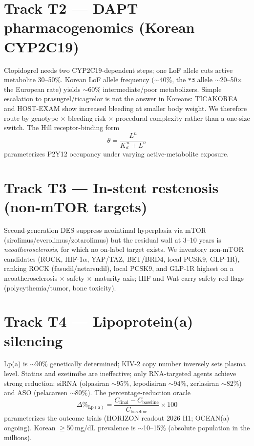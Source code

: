 \documentclass[11pt]{article}
\begin{document}
\section{Track T2 --- DAPT pharmacogenomics (Korean CYP2C19)}
\label{sec:daptpgx}

Clopidogrel needs two CYP2C19-dependent steps; one LoF allele cuts active metabolite 30--50\%. Korean LoF allele frequency ($\sim$40\%, the \texttt{*3} allele $\sim$20--50$\times$ the European rate) yields $\sim$60\% intermediate/poor metabolizers. Simple escalation to prasugrel/ticagrelor is not the answer in Koreans: TICAKOREA and HOST-EXAM show increased bleeding at smaller body weight. We therefore route by genotype $\times$ bleeding risk $\times$ procedural complexity rather than a one-size switch. The Hill receptor-binding form
\begin{equation}
\theta = \frac{L^{n}}{K_d^{\,n} + L^{n}}
\label{eq:hill}
\end{equation}
parameterizes P2Y12 occupancy under varying active-metabolite exposure.

\section{Track T3 --- In-stent restenosis (non-mTOR targets)}
\label{sec:isr}

Second-generation DES suppress neointimal hyperplasia via mTOR (sirolimus/everolimus/zotarolimus) but the residual wall at 3--10 years is \emph{neoatherosclerosis}, for which no on-label target exists. We inventory non-mTOR candidates (ROCK, HIF-1$\alpha$, YAP/TAZ, BET/BRD4, local PCSK9, GLP-1R), ranking ROCK (fasudil/netarsudil), local PCSK9, and GLP-1R highest on a neoatherosclerosis $\times$ safety $\times$ maturity axis; HIF and Wnt carry safety red flags (polycythemia/tumor, bone toxicity).

\section{Track T4 --- Lipoprotein(a) silencing}
\label{sec:lpa}

Lp(a) is $\sim$90\% genetically determined; KIV-2 copy number inversely sets plasma level. Statins and ezetimibe are ineffective; only RNA-targeted agents achieve strong reduction: siRNA (olpasiran $\sim$95\%, lepodisiran $\sim$94\%, zerlasiran $\sim$82\%) and ASO (pelacarsen $\sim$80\%). The percentage-reduction oracle
\begin{equation}
\Delta\%_{\mathrm{Lp(a)}} = \frac{C_{\mathrm{final}} - C_{\mathrm{baseline}}}{C_{\mathrm{baseline}}}\times 100
\label{eq:ldlpct}
\end{equation}
parameterizes the outcome trials (HORIZON readout 2026 H1; OCEAN(a) ongoing). Korean $\geq$50\,mg/dL prevalence is $\sim$10--15\% (absolute population in the millions).
\end{document}
